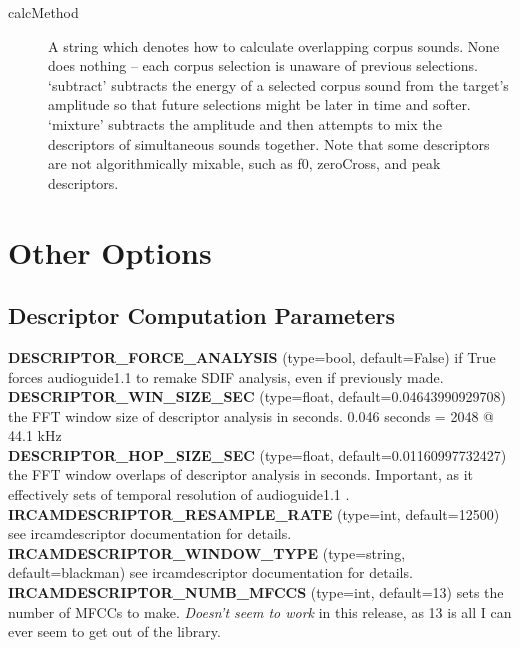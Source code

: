 \documentclass{article}
\newcommand{\optEntry}[4]{\textbf{#1} (type=#2, default=#3) #4\hspace{0.5em}\\}
\newcommand{\ag}{audioguide1.1 }
\begin{document}
\begin{spacing}{1.2}
\begin{description}

\item[calcMethod] A string which denotes how to calculate overlapping corpus sounds.  None does nothing -- each corpus selection is unaware of previous selections.  `subtract' subtracts the energy of a selected corpus sound from the target's amplitude so that future selections might be later in time and softer.  `mixture' subtracts the amplitude and then attempts to mix the descriptors of simultaneous sounds together.  Note that some descriptors are not algorithmically mixable, such as f0, zeroCross, and peak descriptors.
\end{description}



\section{Other Options}
\subsection{Descriptor Computation Parameters}
\optEntry{DESCRIPTOR\_FORCE\_ANALYSIS}{bool}{False}{if True forces \ag to remake SDIF analysis, even if previously made.}

\optEntry{DESCRIPTOR\_WIN\_SIZE\_SEC}{float}{0.04643990929708}{the FFT window size of descriptor analysis in seconds.  0.046 seconds = 2048 @ 44.1 kHz}

\optEntry{DESCRIPTOR\_HOP\_SIZE\_SEC}{float}{0.01160997732427}{the FFT window overlaps of descriptor analysis in seconds.  Important, as it effectively sets of temporal resolution of \ag.}

\optEntry{IRCAMDESCRIPTOR\_RESAMPLE\_RATE}{int}{12500}{see ircamdescriptor documentation for details.}

\optEntry{IRCAMDESCRIPTOR\_WINDOW\_TYPE}{string}{blackman}{see ircamdescriptor documentation for details.}

\optEntry{IRCAMDESCRIPTOR\_NUMB\_MFCCS}{int}{13}{sets the number of MFCCs to make.  \emph{Doesn't seem to work} in this release, as 13 is all I can ever seem to get out of the library.}


\end{spacing}
\end{document}
